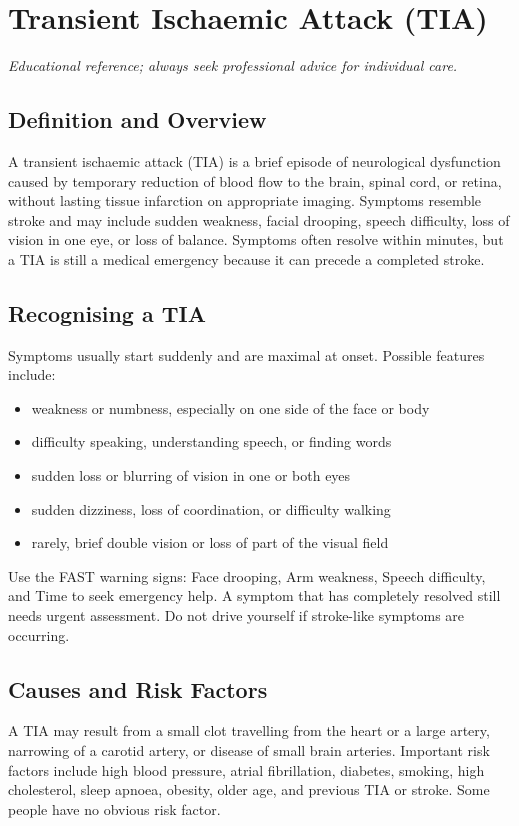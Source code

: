 \chapter{Transient Ischaemic Attack (TIA)}
\medskip
\noindent\textit{Educational reference; always seek professional advice for individual care.}

\section*{Definition and Overview}
A transient ischaemic attack (TIA) is a brief episode of neurological dysfunction caused by temporary reduction of blood flow to the brain, spinal cord, or retina, without lasting tissue infarction on appropriate imaging. Symptoms resemble stroke and may include sudden weakness, facial drooping, speech difficulty, loss of vision in one eye, or loss of balance. Symptoms often resolve within minutes, but a TIA is still a medical emergency because it can precede a completed stroke.

\section*{Recognising a TIA}
Symptoms usually start suddenly and are maximal at onset. Possible features include:
\begin{itemize}
    \item weakness or numbness, especially on one side of the face or body
    \item difficulty speaking, understanding speech, or finding words
    \item sudden loss or blurring of vision in one or both eyes
    \item sudden dizziness, loss of coordination, or difficulty walking
    \item rarely, brief double vision or loss of part of the visual field
\end{itemize}

Use the FAST warning signs: Face drooping, Arm weakness, Speech difficulty, and Time to seek emergency help. A symptom that has completely resolved still needs urgent assessment. Do not drive yourself if stroke-like symptoms are occurring.

\section*{Causes and Risk Factors}
A TIA may result from a small clot travelling from the heart or a large artery, narrowing of a carotid artery, or disease of small brain arteries. Important risk factors include high blood pressure, atrial fibrillation, diabetes, smoking, high cholesterol, sleep apnoea, obesity, older age, and previous TIA or stroke. Some people have no obvious risk factor.

